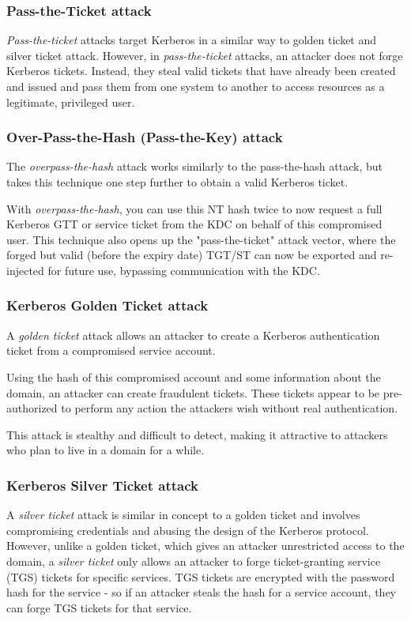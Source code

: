 \subsubsection{Pass-the-Ticket attack}
\textit{Pass-the-ticket} attacks target Kerberos in a similar way to golden ticket and silver ticket attack. However, in \textit{pass-the-ticket} attacks, an attacker does not forge Kerberos tickets. Instead, they steal valid tickets that have already been created and issued and pass them from one system to another to access resources as a legitimate, privileged user.

\columnbreak

\subsubsection{Over-Pass-the-Hash (Pass-the-Key) attack}
The \textit{overpass-the-hash} attack works similarly to the pass-the-hash attack, but takes this technique one step further to obtain a valid Kerberos ticket.

With \textit{overpass-the-hash}, you can use this NT hash twice to now request a full Kerberos GTT or service ticket from the KDC on behalf of this compromised user. This technique also opens up the "pass-the-ticket" attack vector, where the forged but valid (before the expiry date) TGT/ST can now be exported and re-injected for future use, bypassing communication with the KDC.

\subsubsection{Kerberos Golden Ticket attack}
A \textit{golden ticket} attack allows an attacker to create a Kerberos authentication ticket from a compromised service account.

Using the hash of this compromised account and some information about the domain, an attacker can create fraudulent tickets. These tickets appear to be pre-authorized to perform any action the attackers wish without real authentication.

This attack is stealthy and difficult to detect, making it attractive to attackers who plan to live in a domain for a while.

\subsubsection{Kerberos Silver Ticket attack}
A \textit{silver ticket} attack is similar in concept to a golden ticket and involves compromising credentials and abusing the design of the Kerberos protocol. However, unlike a golden ticket, which gives an attacker unrestricted access to the domain, a \textit{silver ticket} only allows an attacker to forge ticket-granting service (TGS) tickets for specific services. TGS tickets are encrypted with the password hash for the service - so if an attacker steals the hash for a service account, they can forge TGS tickets for that service.

